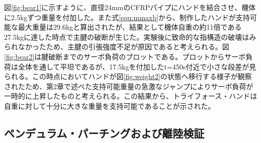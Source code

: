 \documentclass{jarticle}
\begin{document}
図\ref{fig:bear1}に示すように、直径24mmのCFRPパイプにハンドを結合させ、機体に2.5kgずつ重量を付加した。また式\ref{equ:mmaxb}から、制作したハンドが支持可能な最大重量は29.6kgと算出されたが、結果として機体自重の約11倍である27.5kgに達した時点で主腱の破断が生じた。実験後に致命的な指構造の破壊はみられなかったため、主腱の引張強度不足が原因であると考えられる。図\ref{fig:bear2}は腱破断までのサーボ負荷のプロットである。プロットからサーボ負荷は全体を通して平坦であるが、17.5kgを付加したt=450s付近で小さな段差が見られる。この時点においてハンドが図\ref{fig:weight2}の状態へ移行する様子が観察されたため、第2章で述べた支持可能重量の急激なジャンプによりサーボ負荷が一時的に上昇したものと考えられる。この結果から、トライフォース・ハンドは自重に対して十分に大きな重量を支持可能であることが示された。
\subsection{ペンデュラム・パーチングおよび離陸検証}
\vspace{-2mm}
\end{document}
